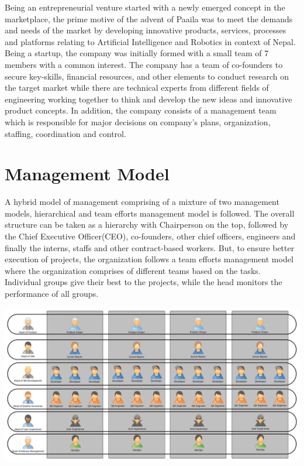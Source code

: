 \documentclass[12pt,a4paper]{scrreprt}
\begin{document}
Being an entrepreneurial venture started with a newly emerged concept in the marketplace, the prime motive of the advent of Paaila was to meet the demands and needs of the market by developing innovative products, services, processes and platforms relating to Artificial Intelligence and Robotics in context of Nepal. Being a startup, the company was initially formed with a small team of 7 members with a common interest. The company has a team of co-founders to secure key-skills, financial
resources, and other elements to conduct research on the target market while there are technical experts from different fields of engineering working together to think and develop the new ideas and innovative product concepts. In addition, the company consists of a management team which is responsible for major decisions on company’s plans, organization, staffing, coordination and control. \\

\section{Management Model}
    A hybrid model of management comprising of a mixture of two management models, hierarchical and team efforts management model is followed. The overall structure can be taken as a hierarchy with Chairperson on the top, followed by the Chief Executive Officer(CEO), co-founders, other chief officers, engineers and finally the interns, staffs and other contract-based workers. But, to ensure better execution of projects, the organization follows a team efforts management model where the organization comprises of different teams based on the tasks. Individual groups give their best to the projects, while the head monitors the performance of all groups.

    \begin{center}
        \includegraphics[scale=0.28]{team-based-MM}
    \end{center}
\end{document}

